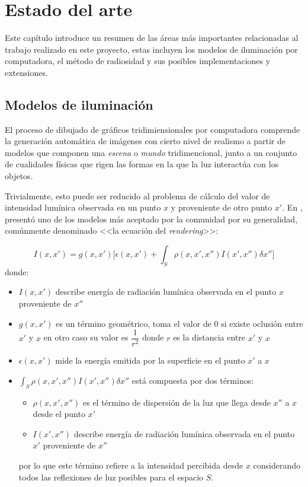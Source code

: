 \chapter{Estado del arte}
\label{ch:chap02}

Este capítulo introduce un resumen de las áreas más importantes relacionadas al trabajo realizado en este proyecto, estas incluyen los modelos de iluminación por computadora, el método de radiosidad y sus posibles implementaciones y extensiones.

\section{Modelos de iluminación}
\label{sec:dibujado}

El proceso de dibujado de gráficos tridimiensionales por computadora comprende la generación automática de imágenes con cierto nivel de realismo a partir de modelos que componen una \textit{escena} o \textit{mundo} tridimencional, junto a un conjunto de cualidades físicas que rigen las formas en la que la luz interactúa con los objetos.

Trivialmente, esto puede ser reducido al problema de cálculo del valor de intensidad lumínica observada en un punto $x$ y proveniente de otro punto $x'$. En  \citeyear{Kajiya}, \citeauthor{Kajiya} presentó uno de los modelos más aceptado por la comunidad por su generalidad, comúnmente denominado <<la ecuación del \textit{rendering}>>:

\begin{equation}
    I(x,x') = g(x,x') \bigg[\epsilon(x,x') + \int_{S} \rho(x,x',x'')I(x',x'') \delta x''\bigg] \label{eq:rendering}
\end{equation}
donde:
\begin{itemize}
    \item $I(x,x')$ describe energía de radiación lumínica observada en el punto $x$ proveniente de $x''$
    \item $g(x,x')$ es un término geométrico, toma el valor de $0$ si existe oclusión entre $x'$ y $x$ en otro caso su valor es $\dfrac{1}{r^{2}}$ donde $r$ es la distancia entre $x'$ y $x$
    \item $\epsilon(x,x')$ mide la energía emitida por la superficie en el punto $x'$ a $x$
    \item $\int_{S} \rho(x,x',x'')I(x',x'') \delta x''$ está compuesta por dos términos:
        \begin{itemize}
            \item $\rho(x,x',x'')$ es el término de dispersión de la luz que llega desde $x''$ a $x$ desde el punto $x'$
            \item $I(x',x'')$ describe energía de radiación lumínica observada en el punto $x'$ proveniente de $x''$
        \end{itemize}
    por lo que este término refiere a la intensidad percibida desde $x$ considerando todos las reflexiones de
    luz posibles para el espacio $S$.
\end{itemize}

